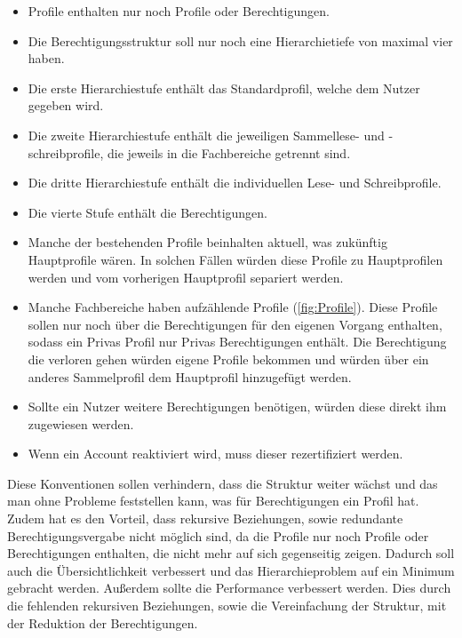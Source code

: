 \begin{itemize}
	\item Profile enthalten nur noch Profile oder Berechtigungen.
	\item Die Berechtigungsstruktur soll nur noch eine Hierarchietiefe von maximal vier haben.
	\item Die erste Hierarchiestufe enthält das Standardprofil, welche dem Nutzer gegeben wird.
	\item Die zweite Hierarchiestufe enthält die jeweiligen Sammellese- und -schreibprofile, die jeweils in die Fachbereiche getrennt sind.
	\item Die dritte Hierarchiestufe enthält die individuellen Lese- und Schreibprofile.
	\item Die vierte Stufe enthält die Berechtigungen.
	\item Manche der bestehenden Profile beinhalten aktuell, was zukünftig Hauptprofile wären.
In solchen Fällen würden diese Profile zu Hauptprofilen werden und vom vorherigen Hauptprofil separiert werden.
	\item Manche Fachbereiche haben aufzählende Profile (\ref{fig:Profile}).
Diese Profile sollen nur noch über die Berechtigungen für den eigenen Vorgang enthalten, sodass ein Privas Profil nur Privas Berechtigungen enthält.
Die Berechtigung die verloren gehen würden eigene Profile bekommen und würden über ein anderes Sammelprofil dem Hauptprofil hinzugefügt werden.
	\item Sollte ein Nutzer weitere Berechtigungen benötigen, würden diese direkt ihm zugewiesen werden.
	\item Wenn ein Account reaktiviert wird, muss dieser rezertifiziert werden.
\end{itemize}
Diese Konventionen sollen verhindern, dass die Struktur weiter wächst und das man ohne Probleme feststellen kann, was für Berechtigungen ein Profil hat.
Zudem hat es den Vorteil, dass rekursive Beziehungen, sowie redundante Berechtigungsvergabe nicht möglich sind, da die Profile nur noch Profile oder Berechtigungen enthalten, die nicht mehr auf sich gegenseitig zeigen.
Dadurch soll auch die Übersichtlichkeit verbessert und das Hierarchieproblem auf ein Minimum gebracht werden.
Außerdem sollte die Performance verbessert werden. Dies durch die fehlenden rekursiven Beziehungen, sowie die Vereinfachung der Struktur, mit der Reduktion der Berechtigungen.
